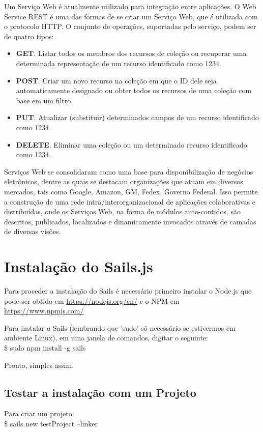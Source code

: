 \documentclass[a4paper,11pt]{article}
\begin{document}
Um Serviço Web é atualmente utilizado para integração entre aplicações. O Web Service REST é uma das formas de se criar um Serviço Web, que é utilizada com o protocolo HTTP. O conjunto de operações, suportadas pelo serviço, podem ser de quatro tipos: \vspace{-1em}
\begin{itemize}
  \item \textbf{GET}. Listar todos os membros dos recursos de coleção ou recuperar uma 
  determinada representação de um recurso identificado como 1234.
  \item \textbf{POST}. Criar um novo recurso na coleção em que o ID dele seja automaticamente designado ou obter todos os recursos de uma coleção com base em um filtro.
  \item \textbf{PUT}. Atualizar (substituir) determinados campos de um recurso identificado como 1234.
  \item \textbf{DELETE}. Eliminar uma coleção ou um determinado recurso identificado como 1234.
\end{itemize}

Serviços Web se consolidaram como uma base para disponibilização de negócios eletrônicos, dentre as quais se destacam organizações que atuam em diversos mercados, tais como Google, Amazon, GM, Fedex, Governo Federal. Isso permite a construção de uma rede intra/interorganizacional de aplicações colaborativas e distribuídas, onde os Serviços Web, na forma de módulos auto-contidos, são descritos, publicados, localizados e dinamicamente invocados através de camadas de diversas visões.

\section{Instalação do Sails.js}
Para proceder a instalação do Sails é necessário primeiro instalar o Node.js
que pode ser obtido em \url{https://nodejs.org/en/} e o NPM  em \url{https://www.npmjs.com/} 

Para instalar o Sails (lembrando que 'sudo' só necessário se estivermos em
ambiente Linux), em uma janela de comandos, digitar o seguinte: \\
{\ttfamily\$ sudo npm install -g sails}

Pronto, simples assim.

\subsection{Testar a instalação com um Projeto}
Para criar um projeto: \\
{\ttfamily\$ sails new testProject --linker}
\end{document}
